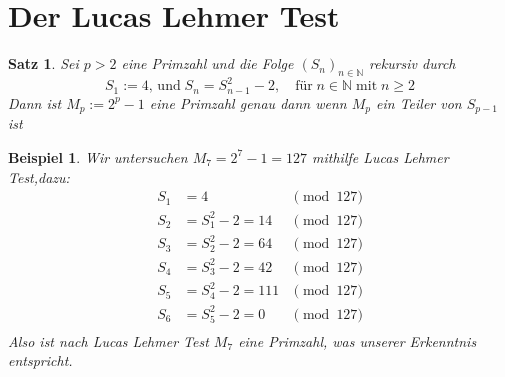 \documentclass{article}
\newtheorem{theorem}{Satz}
\newtheorem{example}{Beispiel}
\newcommand{\Nature}{\ensuremath{\mathbb{N}}}
\begin{document}
\section{Der Lucas Lehmer Test}
\begin{theorem}\label{lucas}
	Sei $p > 2$ eine Primzahl und die Folge $(S_n)_{n \in \Nature}$ rekursiv durch
	\[
		S_1 := 4,\, \mbox{und} \; S_n = S_{n-1}^2 - 2,\quad \mbox{f\"{u}r} \; n \in \Nature \; \mbox{mit} \;n \geq 2
	\]
	Dann ist $M_p := 2^p - 1$ eine Primzahl genau dann wenn $M_p$ ein Teiler von $S_{p-1}$ ist
\end{theorem}

\begin{example}
	Wir untersuchen $M_7 = 2^7 - 1 = 127$ mithilfe \emph{Lucas Lehmer Test},dazu:
	\begin{align*}
			S_1 &= 4 & \pmod{127}\\
			S_2 &= S_1^2 - 2 = 14 & \pmod{127}\\
			S_3 &= S_2^2 - 2 = 64 & \pmod{127}\\
			S_4 &= S_3^2 - 2 = 42 & \pmod{127}\\
			S_5 &= S_4^2 - 2 = 111 & \pmod{127}\\
			S_6 &= S_5^2 - 2 = 0 & \pmod{127}\\
	\end{align*}
	Also ist nach \emph{Lucas Lehmer Test} $M_7$ eine Primzahl, was unserer Erkenntnis entspricht.
\end{example}
\end{document}
